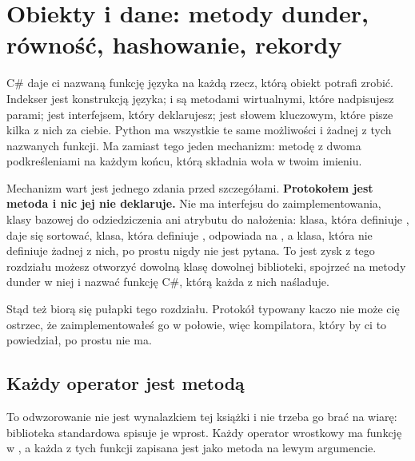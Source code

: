 
\chapter{Obiekty i dane: metody dunder, równość, hashowanie, rekordy}
\label{ch:objects}

\noindent
C\# daje ci nazwaną funkcję języka na każdą rzecz, którą obiekt potrafi
zrobić. Indekser jest konstrukcją języka;  i
 są metodami wirtualnymi, które nadpisujesz parami;
 jest interfejsem, który deklarujesz;  jest
słowem kluczowym, które pisze kilka z nich za ciebie. Python ma wszystkie
te same możliwości i żadnej z tych nazwanych funkcji. Ma zamiast tego
jeden mechanizm: metodę z dwoma podkreśleniami na każdym końcu, którą
składnia woła w twoim imieniu.

Mechanizm wart jest jednego zdania przed szczegółami. \textbf{Protokołem
jest metoda i nic jej nie deklaruje.} Nie ma interfejsu do
zaimplementowania, klasy bazowej do odziedziczenia ani atrybutu do
nałożenia: klasa, która definiuje , daje się sortować,
klasa, która definiuje , odpowiada na , a
klasa, która nie definiuje żadnej z nich, po prostu nigdy nie jest pytana.
To jest zysk z tego rozdziału \dash{} możesz otworzyć dowolną klasę
dowolnej biblioteki, spojrzeć na metody dunder w niej i nazwać funkcję
C\#, którą każda z nich naśladuje.

Stąd też biorą się pułapki tego rozdziału. Protokół typowany kaczo nie może
cię ostrzec, że zaimplementowałeś go w połowie, więc kompilatora, który by
ci to powiedział, po prostu nie ma.

\section{Każdy operator jest metodą}
\label{sec:ch04-protocol}

To odwzorowanie nie jest wynalazkiem tej książki i nie trzeba go brać na
wiarę: biblioteka standardowa spisuje je wprost. Każdy operator wrostkowy
ma funkcję w , a każda z tych funkcji zapisana jest jako
metoda na lewym argumencie.

